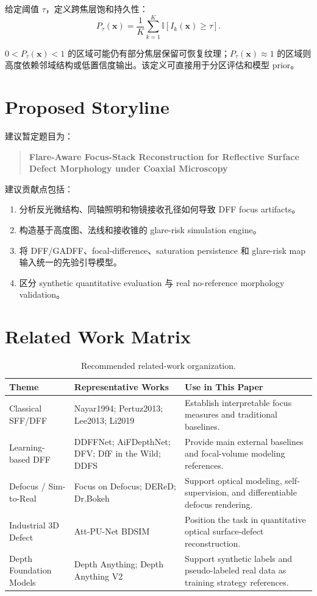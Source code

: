 \documentclass[11pt,a4paper]{ctexart}
\begin{document}
给定阈值 $\tau$，定义跨焦层饱和持久性：
\begin{equation}
P_{\tau}(\mathbf{x})=\frac{1}{K}\sum_{k=1}^{K}\mathbb{I}[I_k(\mathbf{x})\geq\tau].
\end{equation}

$0<P_{\tau}(\mathbf{x})<1$ 的区域可能仍有部分焦层保留可恢复纹理；$P_{\tau}(\mathbf{x})\approx1$ 的区域则高度依赖邻域结构或低置信度输出。该定义可直接用于分区评估和模型 prior。

\section{Proposed Storyline}

建议暂定题目为：

\begin{quote}
\textbf{Flare-Aware Focus-Stack Reconstruction for Reflective Surface Defect Morphology under Coaxial Microscopy}
\end{quote}

建议贡献点包括：

\begin{enumerate}[leftmargin=2em]
  \item 分析反光微结构、同轴照明和物镜接收孔径如何导致 DFF focus artifacts。
  \item 构造基于高度图、法线和接收锥的 glare-risk simulation engine。
  \item 将 DFF/GADFF、focal-difference、saturation persistence 和 glare-risk map 输入统一的先验引导模型。
  \item 区分 synthetic quantitative evaluation 与 real no-reference morphology validation。
\end{enumerate}

\section{Related Work Matrix}

\begin{table}[htbp]
\centering
\small
\begin{tabular}{p{3cm}p{4cm}p{6cm}}
\toprule
Theme & Representative Works & Use in This Paper \\
\midrule
Classical SFF/DFF & Nayar1994; Pertuz2013; Lee2013; Li2019 & Establish interpretable focus measures and traditional baselines. \\
Learning-based DFF & DDFFNet; AiFDepthNet; DFV; DfF in the Wild; DDFS & Provide main external baselines and focal-volume modeling references. \\
Defocus / Sim-to-Real & Focus on Defocus; DEReD; Dr.Bokeh & Support optical modeling, self-supervision, and differentiable defocus rendering. \\
Industrial 3D Defect & Att-PU-Net BDSIM & Position the task in quantitative optical surface-defect reconstruction. \\
Depth Foundation Models & Depth Anything; Depth Anything V2 & Support synthetic labels and pseudo-labeled real data as training strategy references. \\
\bottomrule
\end{tabular}
\caption{Recommended related-work organization.}
\end{table}
\end{document}
